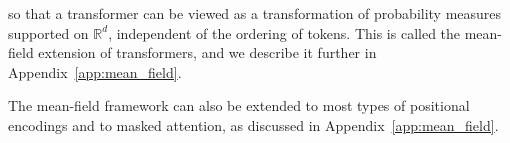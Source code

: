 so that a transformer can be viewed as a transformation of probability measures supported on \( \mathbb{R}^d \), independent of the ordering of tokens. This is called the mean-field extension of transformers, and we describe it further in Appendix~\ref{app:mean_field}.

\begin{remark}
    The mean-field framework can also be extended to most types of positional encodings and to masked attention, as discussed in Appendix~\ref{app:mean_field}.
\end{remark}

